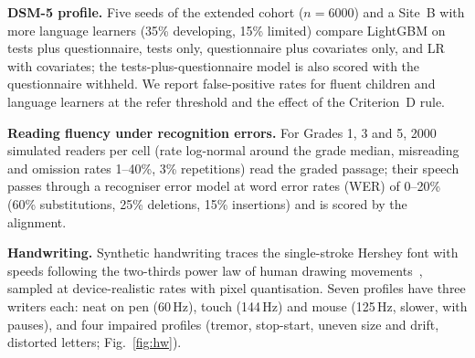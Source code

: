 \documentclass[conference]{IEEEtran}
\begin{document}
\textbf{DSM-5 profile.} Five seeds of the extended cohort ($n{=}6000$) and a Site~B
with more language learners (35\% developing, 15\% limited) compare LightGBM on tests
plus questionnaire, tests only, questionnaire plus covariates only, and LR with
covariates; the tests-plus-questionnaire model is also scored with the questionnaire
withheld. We report false-positive rates for fluent children and language learners
at the refer threshold and the effect of the Criterion~D rule.

\textbf{Reading fluency under recognition errors.} For Grades 1, 3 and 5, 2000
simulated readers per cell (rate log-normal around the grade median, misreading and
omission rates 1--40\%, 3\% repetitions) read the graded passage; their speech
passes through a recogniser error model at word error rates (WER) of 0--20\%
(60\% substitutions, 25\% deletions, 15\% insertions) and is scored by the
alignment.

\textbf{Handwriting.} Synthetic handwriting traces the single-stroke Hershey font
with speeds following the two-thirds power law of human drawing
movements~\cite{lacquaniti1983}, sampled at device-realistic rates with pixel
quantisation. Seven profiles have three writers each: neat on pen (60\,Hz),
touch (144\,Hz) and mouse (125\,Hz, slower, with pauses), and four impaired profiles
(tremor, stop-start, uneven size and drift, distorted letters; Fig.~\ref{fig:hw}).

\end{document}
